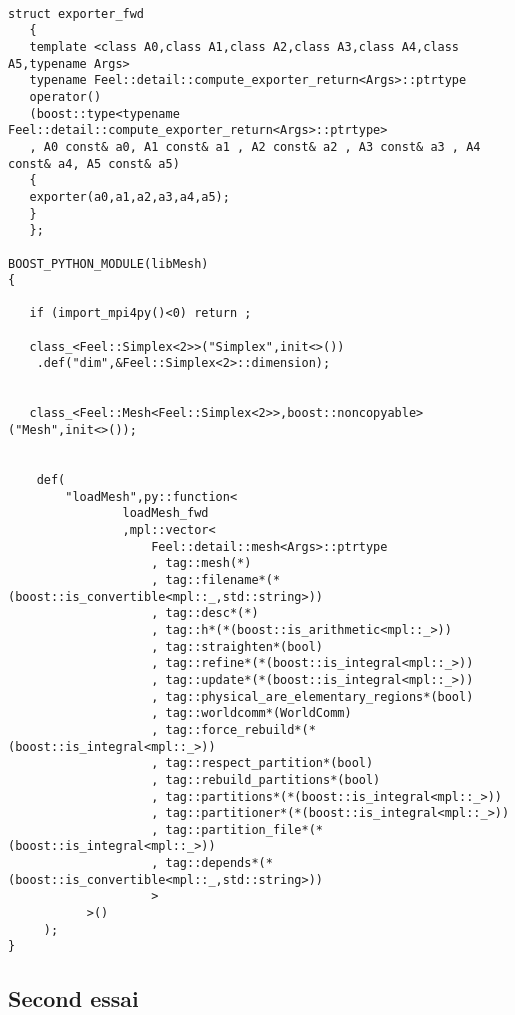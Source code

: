 \documentclass[12pt]{article}
\begin{document}
\begin{lstlisting} 

struct exporter_fwd
   {
   template <class A0,class A1,class A2,class A3,class A4,class A5,typename Args>
   typename Feel::detail::compute_exporter_return<Args>::ptrtype
   operator() 
   (boost::type<typename Feel::detail::compute_exporter_return<Args>::ptrtype>
   , A0 const& a0, A1 const& a1 , A2 const& a2 , A3 const& a3 , A4 const& a4, A5 const& a5)
   {
   exporter(a0,a1,a2,a3,a4,a5);
   }
   };

BOOST_PYTHON_MODULE(libMesh)
{
   
   if (import_mpi4py()<0) return ;
       
   class_<Feel::Simplex<2>>("Simplex",init<>())
    .def("dim",&Feel::Simplex<2>::dimension);
   
   
   class_<Feel::Mesh<Feel::Simplex<2>>,boost::noncopyable>("Mesh",init<>());

    
    def(
        "loadMesh",py::function<
                loadMesh_fwd
                ,mpl::vector<
                    Feel::detail::mesh<Args>::ptrtype
                    , tag::mesh(*)
                    , tag::filename*(*(boost::is_convertible<mpl::_,std::string>))
                    , tag::desc*(*)
                    , tag::h*(*(boost::is_arithmetic<mpl::_>))
                    , tag::straighten*(bool)
                    , tag::refine*(*(boost::is_integral<mpl::_>))
                    , tag::update*(*(boost::is_integral<mpl::_>))
                    , tag::physical_are_elementary_regions*(bool)
                    , tag::worldcomm*(WorldComm)
                    , tag::force_rebuild*(*(boost::is_integral<mpl::_>))
                    , tag::respect_partition*(bool)
                    , tag::rebuild_partitions*(bool)
                    , tag::partitions*(*(boost::is_integral<mpl::_>))
                    , tag::partitioner*(*(boost::is_integral<mpl::_>))
                    , tag::partition_file*(*(boost::is_integral<mpl::_>))
                    , tag::depends*(*(boost::is_convertible<mpl::_,std::string>))
                    >
           >()
     );
}
\end{lstlisting}

\subsection{Second essai}
\end{document}
